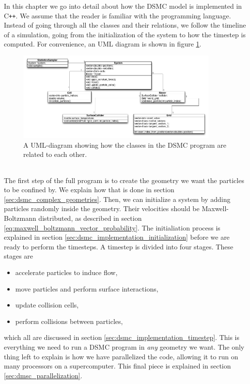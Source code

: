 In this chapter we go into detail about how the DSMC model is implemented in C{}\verb!++!. We assume that the reader is familiar with the programming language. Instead of going through all the classes and their relations, we follow the timeline of a simulation, going from the initialization of the system to how the timestep is computed. For convenience, an UML diagram is shown in figure \ref{fig:dsmc_uml_diagram}.
\begin{figure}[h]
\begin{center}
\includegraphics[width=0.9\textwidth, trim=0cm 0cm 0cm 0cm, clip]{DSMC/figures/dsmcuml.png}
\end{center}
\caption{A UML-diagram showing how the classes in the DSMC program are related to each other.}
\label{fig:dsmc_uml_diagram}
\end{figure}
\\
The first step of the full program is to create the geometry we want the particles to be confined by. We explain how that is done in section \ref{sec:dsmc_complex_geometries}. Then, we can initialize a system by adding particles randomly inside the geometry. Their velocities should be Maxwell-Boltzmann distributed, as described in section \ref{eq:maxwell_boltzmann_vector_probability}. The initialiation process is explained in section \ref{sec:dsmc_implementation_initialization} before we are ready to perform the timesteps. A timestep is divided into four stages. These stages are
\begin{itemize}
    \item accelerate particles to induce flow,
    \item move particles and perform surface interactions,
    \item update collision cells,
    \item perform collisions between particles,
\end{itemize}
which all are discussed in section \ref{sec:dsmc_implementation_timestep}. This is everything we need to run a DSMC program in \textit{any} geometry we want. The only thing left to explain is how we have parallelized the code, allowing it to run on many processors on a supercomputer. This final piece is explained in section \ref{sec:dmsc_parallelization}. 